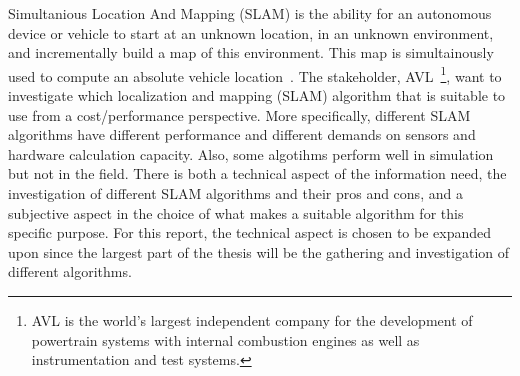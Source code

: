Simultanious Location And Mapping (SLAM) is the ability for an autonomous
device or vehicle to start at an unknown location, in an unknown environment, and
incrementally build a map of this environment. This map is simultainously used to compute
an absolute vehicle location~\cite{938381}. The stakeholder, AVL~\footnote{AVL is the world's largest independent company for the development of powertrain systems with internal combustion engines as well as instrumentation and test systems.}, want to investigate which localization and mapping (SLAM) algorithm
that is suitable to use from a cost/performance perspective. More specifically,
different SLAM algorithms have different performance and different demands on
sensors and hardware calculation capacity. Also, some algotihms perform well in
simulation but not in the field.  There is both a technical aspect of the
information need, the investigation of different SLAM algorithms and their pros
and cons, and a subjective aspect in the choice of what makes a suitable
algorithm for this specific purpose. For this report, the technical aspect is
chosen to be expanded upon since the largest part of the thesis will be the
gathering and investigation of different algorithms.
